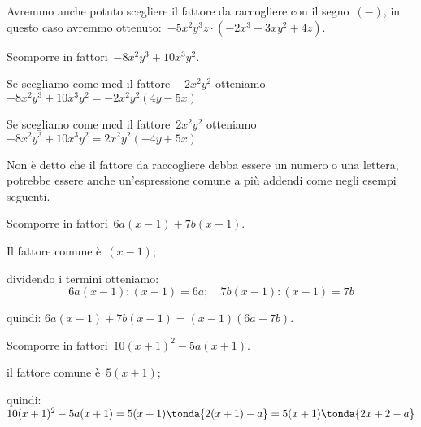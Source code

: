 \osservazione Avremmo anche potuto scegliere il fattore da raccogliere 
 con il segno~\((-)\), in questo caso avremmo 
 ottenuto:~\(-5x^2y^{3}z\cdot (-2x^3+3xy^{2}+4z)\).
 
 \begin{esempio}
Scomporre in fattori~\(-8x^2y^{3}+10x^3y^{2}\).
 \begin{enumerate*}
 \item  Se scegliamo come mcd il fattore~\(-2x^2y^{2}\)
  otteniamo~\(-8x^2y^{3}+10x^3y^{2}=-2x^2y^{2}(4y-5x)\)
 \item Se scegliamo come mcd il fattore~\(2x^2y^{2}\)
  otteniamo~\(-8x^2y^{3}+10x^3y^{2}=2x^2y^{2}(-4y+5x)\)
 \end{enumerate*}
 \end{esempio}

Non è detto che il fattore da raccogliere debba essere un numero o una lettera, 
potrebbe essere anche un'espressione comune a più addendi come negli esempi 
seguenti.


 \begin{esempio}
Scomporre in fattori~\(6a(x-1)+7b(x-1)\).
  \begin{enumeratea}
  \item Il fattore comune è~\((x-1)\); 
  \item dividendo i termini otteniamo:
\[6a(x-1):(x-1)=6a; \quad 7b(x-1):(x-1)=7b\]
  \item quindi: \quad \(6a(x-1)+7b(x-1)=(x-1)(6a+7b)\).
  \end{enumeratea}
 \end{esempio}

 \begin{esempio}
Scomporre in fattori~\(10(x+1)^{2}-5a(x+1)\).
  \begin{enumeratea}
  \item il fattore comune è~\(5(x+1)\);
  \item quindi: \quad 
  \(10(x+1)^{2}-5a(x+1)=5(x+1)\tonda{2(x+1)-a}=5(x+1)\tonda{2x+2-a}\)
  \end{enumeratea}
 \end{esempio}


% 

